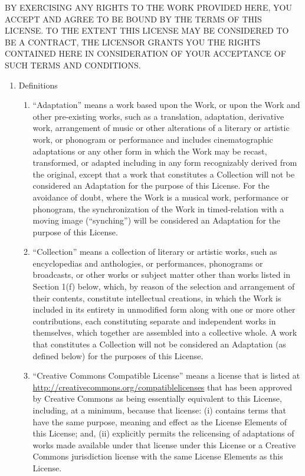 \documentclass[letterpaper,10pt,english]{manual}
\begin{document}
BY EXERCISING ANY RIGHTS TO THE WORK PROVIDED HERE, YOU ACCEPT AND AGREE TO BE BOUND BY THE TERMS OF THIS LICENSE. TO THE EXTENT THIS LICENSE MAY BE CONSIDERED TO BE A CONTRACT, THE LICENSOR GRANTS YOU THE RIGHTS CONTAINED HERE IN CONSIDERATION OF YOUR ACCEPTANCE OF SUCH TERMS AND CONDITIONS.
\begin{enumerate}
\item {} 
Definitions
\begin{enumerate}
\item {} 
``Adaptation'' means a work based upon the Work, or upon the Work and other pre-existing works, such as a translation, adaptation, derivative work, arrangement of music or other alterations of a literary or artistic work, or phonogram or performance and includes cinematographic adaptations or any other form in which the Work may be recast, transformed, or adapted including in any form recognizably derived from the original, except that a work that constitutes a Collection will not be considered an Adaptation for the purpose of this License. For the avoidance of doubt, where the Work is a musical work, performance or phonogram, the synchronization of the Work in timed-relation with a moving image (``synching'') will be considered an Adaptation for the purpose of this License.

\item {} 
``Collection'' means a collection of literary or artistic works, such as encyclopedias and anthologies, or performances, phonograms or broadcasts, or other works or subject matter other than works listed in Section 1(f) below, which, by reason of the selection and arrangement of their contents, constitute intellectual creations, in which the Work is included in its entirety in unmodified form along with one or more other contributions, each constituting separate and independent works in themselves, which together are assembled into a collective whole. A work that constitutes a Collection will not be considered an Adaptation (as defined below) for the purposes of this License.

\item {} 
``Creative Commons Compatible License'' means a license that is listed at \href{http://creativecommons.org/compatiblelicenses}{http://creativecommons.org/compatiblelicenses} that has been approved by Creative Commons as being essentially equivalent to this License, including, at a minimum, because that license: (i) contains terms that have the same purpose, meaning and effect as the License Elements of this License; and, (ii) explicitly permits the relicensing of adaptations of works made available under that license under this License or a Creative Commons jurisdiction license with the same License Elements as this License.


\end{enumerate}
\end{enumerate}
\end{document}
